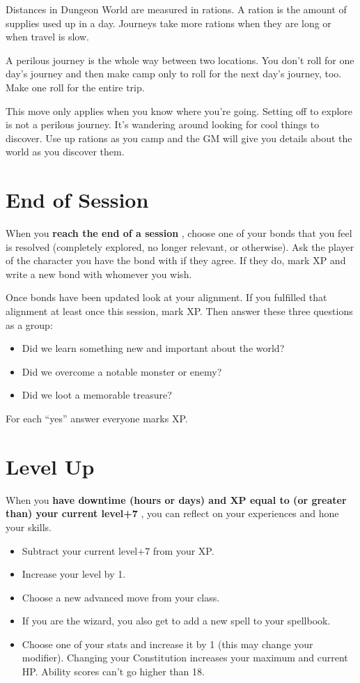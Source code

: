 Distances in Dungeon World are measured in rations. A ration is the amount of supplies used up in a day. Journeys take more rations when they are long or when travel is slow.

A perilous journey is the whole way between two locations. You don't roll for one day's journey and then make camp only to roll for the next day's journey, too. Make one roll for the entire trip.

This move only applies when you know where you're going. Setting off to explore is not a perilous journey. It's wandering around looking for cool things to discover. Use up rations as you camp and the GM will give you details about the world as you discover them.
\newpage
\section*{End of Session}
\HRule
When you \textbf{reach the end of a session}
, choose one of your bonds that you feel is resolved (completely explored, no longer relevant, or otherwise). Ask the player of the character you have the bond with if they agree. If they do, mark XP and write a new bond with whomever you wish.

Once bonds have been updated look at your alignment. If you fulfilled that alignment at least once this session, mark XP\@. Then answer these three questions as a group:
\begin{itemize}
\item Did we learn something new and important about the world?
\item Did we overcome a notable monster or enemy?
\item Did we loot a memorable treasure?
\end{itemize}
\HRule

For each ``yes'' answer everyone marks XP\@.
\section*{Level Up}
\HRule
When you \textbf{have downtime (hours or days) and XP equal to (or greater than) your current level+7}
, you can reflect on your experiences and hone your skills.
\begin{itemize}
\item Subtract your current level+7 from your XP\@.
\item Increase your level by 1.
\item Choose a new advanced move from your class.
\item If you are the wizard, you also get to add a new spell to your spellbook.
\item Choose one of your stats and increase it by 1 (this may change your modifier). Changing your Constitution increases your maximum and current HP\@. Ability scores can't go higher than 18.
\end{itemize}
\HRule
